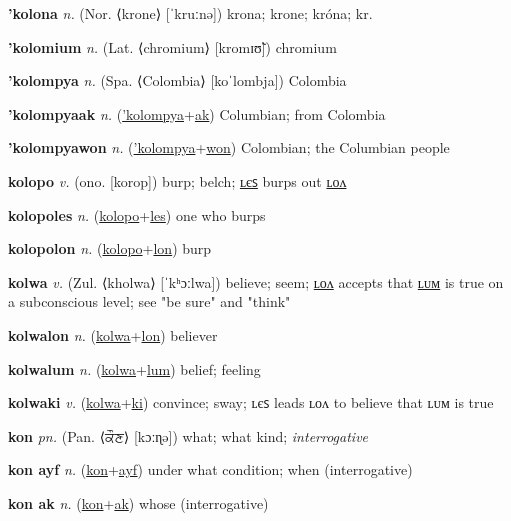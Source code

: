 \textbf{\hypertarget{'kolona}{'kolona}} \textit{n.} (Nor. ⟨krone⟩ [ˈkruːnə])
krona; krone; króna; kr.

\textbf{\hypertarget{'kolomium}{'kolomium}} \textit{n.} (Lat. ⟨chromium⟩ [kromɪʊ̃])
chromium

\textbf{\hypertarget{'kolompya}{'kolompya}} \textit{n.} (Spa. ⟨Colombia⟩ [koˈlombja])
Colombia

\textbf{\hypertarget{'kolompyaak}{'kolompyaak}} \textit{n.} (\hyperlink{'kolompya}{'kolompya}+\allowbreak \hyperlink{ak}{ak})
Columbian; from Colombia

\textbf{\hypertarget{'kolompyawon}{'kolompyawon}} \textit{n.} (\hyperlink{'kolompya}{'kolompya}+\allowbreak \hyperlink{won}{won})
Colombian; the Columbian people

\textbf{\hypertarget{kolopo}{kolopo}} \textit{v.} (ono. [korop])
burp; belch; \hyperlink{kolopoles}{ʟєꜱ} burps out \hyperlink{kolopolon}{ʟᴏᴧ}

\textbf{\hypertarget{kolopoles}{kolopoles}} \textit{n.} (\hyperlink{kolopo}{kolopo}+\allowbreak \hyperlink{les}{les})
one who burps

\textbf{\hypertarget{kolopolon}{kolopolon}} \textit{n.} (\hyperlink{kolopo}{kolopo}+\allowbreak \hyperlink{lon}{lon})
burp

\textbf{\hypertarget{kolwa}{kolwa}} \textit{v.} (Zul. ⟨kholwa⟩ [ˈkʰɔːlwa])
believe; seem; \hyperlink{kolwalon}{ʟᴏᴧ} accepts that \hyperlink{kolwalum}{ʟᴜᴍ} is true on a subconscious level; see "be sure" and "think"

\textbf{\hypertarget{kolwalon}{kolwalon}} \textit{n.} (\hyperlink{kolwa}{kolwa}+\allowbreak \hyperlink{lon}{lon})
believer

\textbf{\hypertarget{kolwalum}{kolwalum}} \textit{n.} (\hyperlink{kolwa}{kolwa}+\allowbreak \hyperlink{lum}{lum})
belief; feeling

\textbf{\hypertarget{kolwaki}{kolwaki}} \textit{v.} (\hyperlink{kolwa}{kolwa}+\allowbreak \hyperlink{ki}{ki})
convince; sway; ʟєꜱ leads ʟᴏᴧ to believe that ʟᴜᴍ is true

\textbf{\hypertarget{kon}{kon}} \textit{pn.} (Pan. ⟨{\gurmukhi{}ਕੌਣ}⟩ [kɔːɳə])
what; what kind; \textit{interrogative}

\textbf{\hypertarget{kon ayf}{kon ayf}} \textit{n.} (\hyperlink{kon}{kon}+\allowbreak \hyperlink{ayf}{ayf})
under what condition; when (interrogative)

\textbf{\hypertarget{kon ak}{kon ak}} \textit{n.} (\hyperlink{kon}{kon}+\allowbreak \hyperlink{ak}{ak})
whose (interrogative)

